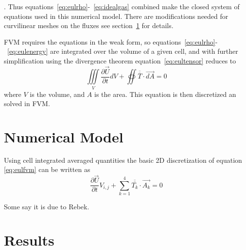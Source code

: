 \documentclass[]{aiaa-tc}%
\newcommand{\pderiv}[2]{\frac{\partial #1}{\partial #2}}
\newcommand*{\rttensor}[1]{\overline{\overline{#1}}}
\begin{document}
. Thus equations~\ref{eq:eulrho}-~\ref{eq:idealgas} combined make the closed system of equations used in this numerical model. There are modifications needed for curvilinear meshes on the fluxes see section~\ref{sec:nummod} for details.

FVM requires the equations in the weak form, so equations~\ref{eq:eulrho}-~\ref{eq:eulenergy} are integrated over the volume of a given cell, and with further simplification using the divergence theorem equation~\ref{eq:eultensor} reduces to
\begin{equation}\label{eq:eulfvm}
  \iiint\limits_V \pderiv{\vec{U}}{t} dV + \oiint \rttensor{T} \cdot \vec{dA} = 0
\end{equation}
where $V$ is the volume, and $A$ is the area. This equation is then discretized an solved in FVM. 

\section{Numerical Model}\label{sec:nummod}
Using cell integrated averaged quantities the basic 2D discretization of equation \ref{eq:eulfvm} can be written as
\begin{equation} \label{eq:euldisc}
  \pderiv{\vec{U}}{t}V_{i,j} + \sum_{k=1}^4\rttensor{T_k}\cdot \vec{A_k} = 0
\end{equation}


Some say it is due to Rebek.\cite{rebek:82bk}

\section{Results}
\end{document}
